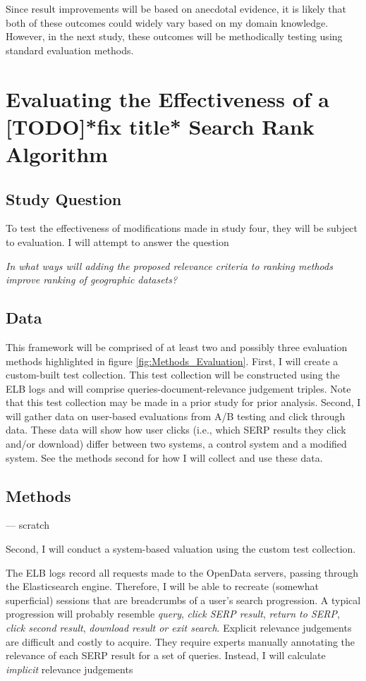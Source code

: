 Since result improvements will be based on anecdotal evidence, it is likely that both of these outcomes could widely vary based on my domain knowledge. However, in the next study, these outcomes will be methodically testing using standard evaluation methods.

\section{Evaluating the Effectiveness of a 
[TODO]*fix title*
Search Rank Algorithm}

\subsection{Study Question}
To test the effectiveness of modifications made in study four, they will be subject to evaluation. I will attempt to answer the question
\linebreak

\emph{In what ways will adding the proposed relevance criteria to ranking methods improve ranking of geographic datasets?}
\linebreak

\subsection{Data}
This framework will be comprised of at least two and possibly three evaluation methods highlighted in figure \ref{fig:Methods_Evaluation}. First, I will create a custom-built test collection. This test collection will be constructed using the ELB logs and will comprise queries-document-relevance judgement triples. Note that this test collection may be made in a prior study for prior analysis. Second, I will gather data on user-based evaluations from A/B testing and click through data. These data will show how user clicks (i.e., which SERP results they click and/or download) differ between two systems, a control system and a modified system. See the methods second for how I will collect and use these data.

\subsection{Methods}



--- scratch

Second, I will conduct a system-based valuation using the custom test collection.

 The ELB logs record all requests made to the OpenData servers, passing through the Elasticsearch engine. Therefore, I will be able to recreate (somewhat superficial) sessions that are breadcrumbs of a user's search progression. A typical progression will probably resemble \emph{query}, \emph{click SERP result}, \emph{return to SERP}, \emph{click second result}, \emph{download result or exit search}. Explicit relevance judgements are difficult and costly to acquire. They require experts manually annotating the relevance of each SERP result for a set of queries. Instead, I will calculate \emph{implicit} relevance judgements

